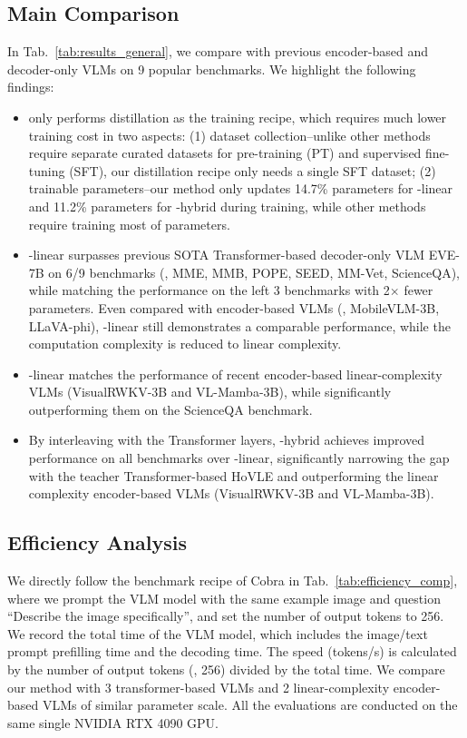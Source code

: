 \subsection{Main Comparison}
In Tab.~\ref{tab:results_general}, we compare \name{} with previous encoder-based and decoder-only VLMs on 9 popular benchmarks. We highlight the following findings:
\begin{itemize}
\item \name{} only performs distillation as the training recipe, which requires much lower training cost in two aspects: (1) dataset collection--unlike other methods require separate curated datasets for pre-training (PT) and supervised fine-tuning (SFT), our distillation recipe only needs a single SFT dataset; (2) trainable parameters--our method only updates 14.7\% parameters for \name{}-linear and 11.2\% parameters for \name{}-hybrid during training, while other methods require training most of parameters.
\item  \name{}-linear surpasses previous SOTA Transformer-based decoder-only VLM EVE-7B on 6/9 benchmarks (\ie, MME, MMB, POPE, SEED, MM-Vet, ScienceQA), while matching the performance on the left 3 benchmarks with 2$\times$ fewer parameters.
Even compared with encoder-based VLMs (\eg, MobileVLM-3B, LLaVA-phi), \name{}-linear still demonstrates a comparable performance, while the computation complexity is reduced to linear complexity.
\item \name{}-linear matches the performance of recent encoder-based linear-complexity VLMs (VisualRWKV-3B and VL-Mamba-3B), while significantly outperforming them on the ScienceQA benchmark.
\item By interleaving with the Transformer layers, \name{}-hybrid achieves improved performance on all benchmarks over \name{}-linear, significantly narrowing the gap with the teacher Transformer-based  HoVLE and outperforming the linear complexity encoder-based VLMs (VisualRWKV-3B and VL-Mamba-3B).
\end{itemize}

\subsection{Efficiency Analysis}

We directly follow the benchmark recipe of Cobra in Tab.~\ref{tab:efficiency_comp}, where we prompt the VLM model with the same example image and question ``Describe the image specifically'', and set the number of output tokens to 256.
We record the total time of the VLM model, which includes the image/text prompt prefilling time and the decoding time. The speed (tokens/s) is calculated by the number of output tokens (\ie, 256) divided by the total time.
We compare our method with 3 transformer-based VLMs and 2 linear-complexity encoder-based VLMs of similar parameter scale. All the evaluations are conducted on the same single NVIDIA RTX 4090 GPU.

